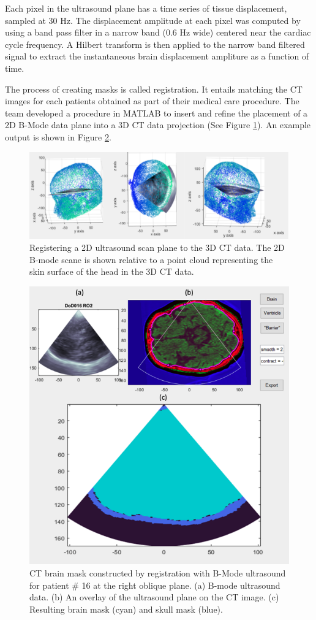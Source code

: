 \documentclass [11pt, proquest] {uwthesis}[2020/02/24]
\begin{document}
Each pixel in the ultrasound plane has a time series of tissue displacement, sampled at 30 Hz. The displacement amplitude at each pixel was 
computed by using a band pass filter in a narrow band (0.6 Hz wide) centered near the cardiac cycle frequency. A Hilbert transform is then 
applied to the narrow band filtered signal to extract the instantaneous brain displacement ampliture as a function of time. 

The process of creating masks is called registration. It entails matching the CT images for each patients obtained as part of their medical
care procedure. The team developed a procedure in MATLAB to insert and refine the placement of a 2D B-Mode data plane into a 3D CT data projection
(See Figure \ref{registration}). An example output is shown in Figure \ref{registration_output}.

\begin{figure}
  \centering
  \includegraphics[width=0.9\linewidth]{figures/registration.png}
  \caption{Registering a 2D ultrasound scan plane to the 3D CT data. The 2D B-mode scane is shown relative to a point cloud representing 
  the skin surface of the head in the 3D CT data.}
  \label{registration}
\end{figure}

\begin{figure}
  \centering
  \includegraphics[width=0.7\linewidth]{figures/registration_output.png}
  \caption{CT brain mask constructed by registration with B-Mode ultrasound for patient \# 16 at the right oblique plane. 
  (a) B-mode ultrasound data. (b) An overlay of the ultrasound plane on the CT image. 
  (c) Resulting brain mask (cyan) and skull mask (blue).}
  \label{registration_output}
\end{figure}
\end{document}
